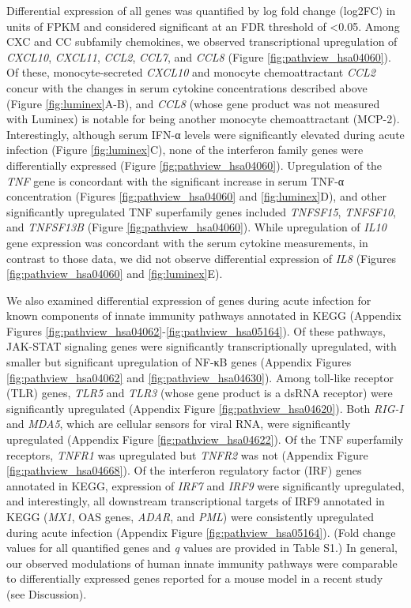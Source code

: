 Differential expression of all genes was quantified by log fold change (log2FC) in units of FPKM and considered significant at an FDR threshold of <0.05. Among CXC and CC subfamily chemokines, we observed transcriptional upregulation of \emph{CXCL10}, \emph{CXCL11}, \emph{CCL2}, \emph{CCL7}, and \emph{CCL8} (Figure \ref{fig:pathview_hsa04060}). Of these, monocyte-secreted \emph{CXCL10} and monocyte chemoattractant \emph{CCL2} concur with the changes in serum cytokine concentrations described above (Figure \ref{fig:luminex}A-B), and \emph{CCL8} (whose gene product was not measured with Luminex) is notable for being another monocyte chemoattractant (MCP-2). Interestingly, although serum IFN-α levels were significantly elevated during acute infection (Figure \ref{fig:luminex}C), none of the interferon family genes were differentially expressed (Figure \ref{fig:pathview_hsa04060}). Upregulation of the \emph{TNF} gene is concordant with the significant increase in serum TNF-α concentration (Figures \ref{fig:pathview_hsa04060} and \ref{fig:luminex}D), and other significantly upregulated TNF superfamily genes included \emph{TNFSF15}, \emph{TNFSF10}, and \emph{TNFSF13B} (Figure \ref{fig:pathview_hsa04060}). While upregulation of \emph{IL10} gene expression was concordant with the serum cytokine measurements, in contrast to those data, we did not observe differential expression of \emph{IL8} (Figures \ref{fig:pathview_hsa04060} and \ref{fig:luminex}E). 

We also examined differential expression of genes during acute infection for known components of innate immunity pathways annotated in KEGG\autocite{Ogata1999} (Appendix Figures \ref{fig:pathview_hsa04062}-\ref{fig:pathview_hsa05164}). Of these pathways, JAK-STAT signaling genes were significantly transcriptionally upregulated, with smaller but significant upregulation of NF-κB genes (Appendix Figures \ref{fig:pathview_hsa04062} and \ref{fig:pathview_hsa04630}). Among toll-like receptor (TLR) genes, \emph{TLR5} and \emph{TLR3} (whose gene product is a dsRNA receptor) were significantly upregulated (Appendix Figure \ref{fig:pathview_hsa04620}). Both \emph{RIG-I} and \emph{MDA5}, which are cellular sensors for viral RNA, were significantly upregulated (Appendix Figure \ref{fig:pathview_hsa04622}). Of the TNF superfamily receptors, \emph{TNFR1} was upregulated but \emph{TNFR2} was not (Appendix Figure \ref{fig:pathview_hsa04668}). Of the interferon regulatory factor (IRF) genes annotated in KEGG, expression of \emph{IRF7} and \emph{IRF9} were significantly upregulated, and interestingly, all downstream transcriptional targets of IRF9 annotated in KEGG (\emph{MX1}, OAS genes, \emph{ADAR}, and \emph{PML}) were consistently upregulated during acute infection (Appendix Figure \ref{fig:pathview_hsa05164}). (Fold change values for all quantified genes and \emph{q} values are provided in Table S1.) In general, our observed modulations of human innate immunity pathways were comparable to differentially expressed genes reported for a mouse model in a recent study (see Discussion). 

